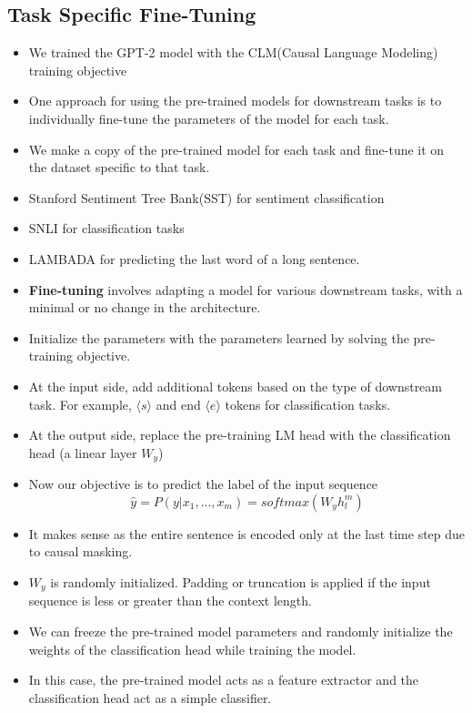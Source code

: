 \documentclass[a4paper]{article}
\begin{document}
\subsection{Task Specific Fine-Tuning}
\begin{itemize}
    \item We trained the GPT-2 model with the CLM(Causal Language Modeling) training objective
    \item One approach for using the pre-trained models for downstream tasks is to individually fine-tune the parameters of the model for each task.
    \item We make a copy of the pre-trained model for each task and fine-tune it on the dataset specific to that task.
    \item Stanford Sentiment Tree Bank(SST) for sentiment classification
    \item SNLI for classification tasks
    \item LAMBADA for predicting the last word of a long sentence.
    \item \textbf{Fine-tuning} involves adapting a model for various downstream tasks, with a minimal or no change in the architecture.
    \item Initialize the parameters with the parameters learned by solving the pre-training objective.
    \item At the input side, add additional tokens based on the type of downstream task. For example, $\langle s\rangle$ and end $\langle e\rangle$ tokens for classification tasks.
    \item At the output side, replace the pre-training LM head with the classification head (a linear layer $W_y$)
    \item Now our objective is to predict the label of the input sequence
    \begin{equation*}
        \hat{y}=P(y|x_1,...,x_m)=softmax(W_yh_l^m)
    \end{equation*}
    \item It makes sense as the entire sentence is encoded only at the last time step due to causal masking.
    \item $W_y$ is randomly initialized. Padding or truncation is applied if the input sequence is less or greater than the context length.
    \item We can freeze the pre-trained model parameters and randomly initialize the weights of the classification head while training the model.
    \item In this case, the pre-trained model acts as a feature extractor and the classification head act as a simple classifier.

\end{itemize}
\end{document}
